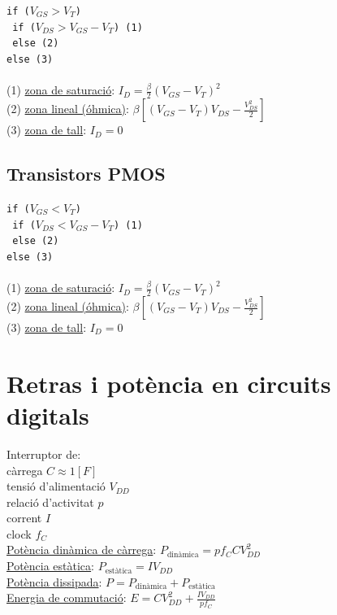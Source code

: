 \documentclass[12pt]{article}
\begin{document}
\begin{multicols}{4}
\texttt{if ($V_{GS} > V_T$) }\\
\texttt{ if ($V_{DS} > V_{GS} - V_T$) (1)} \\
\texttt{ else (2)} \\
\texttt{else (3)} \\
\texttt{ } \\
(1) \underline{zona de saturació}: $I_D = \frac{\beta}{2} (V_{GS}-V_T)^2$ \\
(2) \underline{zona lineal (óhmica)}: $\beta \left[ \left( V_{GS} - V_T \right) V_{DS} - \frac{V_{DS}^2}{2} \right]$ \\
(3) \underline{zona de tall}: $I_D = 0$ \\

\subsection{Transistors PMOS}

\texttt{if ($V_{GS} < V_T$) }\\
\texttt{ if ($V_{DS} < V_{GS} - V_T$) (1)} \\
\texttt{ else (2)} \\
\texttt{else (3)} \\
\texttt{ } \\
(1) \underline{zona de saturació}: $I_D = \frac{\beta}{2} (V_{GS}-V_T)^2$ \\
(2) \underline{zona lineal (óhmica)}: $\beta \left[ \left( V_{GS} - V_T \right) V_{DS} - \frac{V_{DS}^2}{2} \right]$ \\
(3) \underline{zona de tall}: $I_D = 0$ \\

\section{Retras i potència en circuits digitals}

Interruptor de: \\
\qquad càrrega $C \approx 1 [F]$ \\
\qquad tensió d'alimentació $V_{DD}$ \\
\qquad relació d'activitat $p$ \\
\qquad corrent $I$ \\
\qquad clock $f_C$ \\
\underline{Potència dinàmica de càrrega}: $P_{\text{dinàmica}} = p f_C C V_{DD}^2$ \\
\underline{Potència estàtica}: $P_{\text{estàtica}} = I V_{DD}$ \\
\underline{Potència dissipada}: $P = P_{\text{dinàmica}} + P_{\text{estàtica}}$ \\
\underline{Energia de commutació}: $E = C V_{DD}^2 + \frac{I V_{DD}}{p f_C}$ \\









\end{multicols}
\end{document}
